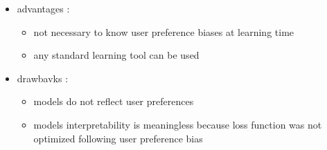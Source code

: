 \documentclass[
]{report}
\providecommand{\tightlist}{%
  \setlength{\itemsep}{0pt}\setlength{\parskip}{0pt}}
\begin{document}
\begin{itemize}
  \begin{itemize}
  \tightlist
  \item
    advantages :

    \begin{itemize}
    \tightlist
    \item
      not necessary to know user preference biases at learning time
    \item
      any standard learning tool can be used
    \end{itemize}
  \item
    drawbavks :

    \begin{itemize}
    \tightlist
    \item
      models do not reflect user preferences
    \item
      models interpretability is meaningless because loss function was not optimized following user preference bias
    \end{itemize}
  \end{itemize}
\end{itemize}

  
\end{document}

